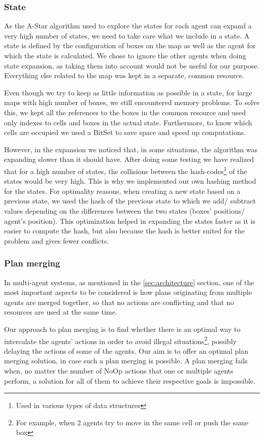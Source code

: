 \subsubsection{State}
As the A-Star algorithm used to explore the states for each agent can expand a very high number of states, we
need to take care what we include in a state. A state is defined by the configuration of boxes on the map as
well as the agent for which the state is calculated. We chose to ignore the other agents when doing state
expansion, as taking them into account would not be useful for our purpose. Everything else related to the map
was kept in a separate, common resource.

Even though we try to keep as little information as possible in a state, for large maps with high number of
boxes, we still encountered memory problems. To solve this, we kept all the references to the boxes in the
common resource and used only indexes to cells and boxes in the actual state. Furthermore, to know which cells
are occupied we used a BitSet to save space and speed up computations.

However, in the expansion we noticed that, in some situations, the algorithm was expanding slower than it
should have. After doing some testing we have realized that for a high number of states, the collisions
between the hash-codes\footnote{Used in various types of data structures} of the states would be very high.
This is why we implemented our own hashing method for the states. For optimality reasons, when creating a new
state based on a previous state, we used the hash of the previous state to which we add/ subtract values
depending on the differences between the two states (boxes' positions/ agent's position). This optimization
helped in expanding the states faster as it is easier to compute the hash, but also because the hash is better
suited for the problem and gives fewer conflicts.

\subsubsection{Plan merging}
\label{sec:plan_merging}

In multi-agent systems, as mentioned in the \ref{sec:architecture} section, one of the most important aspects
to be considered is how plans originating from multiple agents are merged together, so that no actions are
conflicting and that no resources are used at the same time.

Our approach to plan merging is to find whether there is an optimal way to intercalate the agents’ actions in
order to avoid illegal situations\footnote{For example, when 2 agents try to move in the same cell or push the
same box}, possibly delaying the actions of some of the agents. Our aim is to offer an optimal plan merging
solution, in case such a plan merging is possible. A plan merging fails when, no matter the number of NoOp
actions that one or multiple agents perform, a solution for all of them to achieve their respective goals is
impossible.

